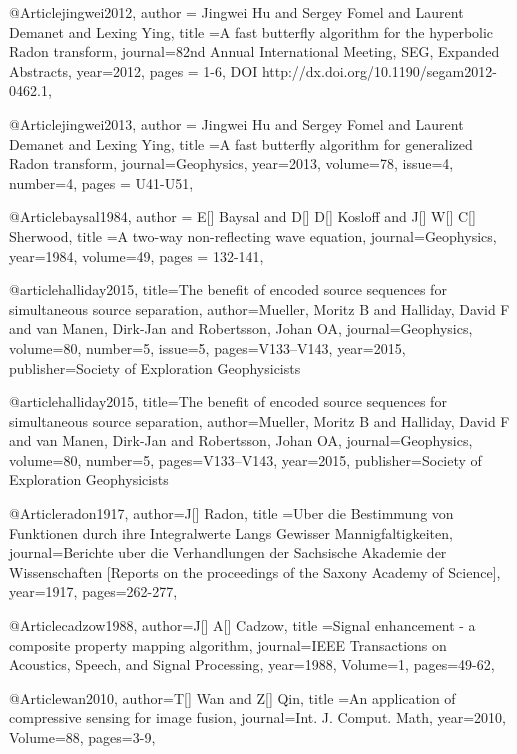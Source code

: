 @Article{jingwei2012,
  author = {Jingwei Hu and Sergey Fomel and Laurent Demanet and Lexing Ying},
  title ={A fast butterfly algorithm for the hyperbolic Radon transform},
  journal={82nd Annual International Meeting, SEG, Expanded Abstracts},
  year=2012,
  pages = {1-6, DOI http://dx.doi.org/10.1190/segam2012-0462.1},
}

@Article{jingwei2013,
  author = {Jingwei Hu and Sergey Fomel and Laurent Demanet and Lexing Ying},
  title ={A fast butterfly algorithm for generalized Radon transform},
  journal={Geophysics},
  year=2013,
  volume=78,
  issue=4,
  number=4,
  pages = {U41-U51},
}

@Article{baysal1984,
  author = {E[] Baysal and D[] D[] Kosloff and J[] W[] C[] Sherwood},
  title ={A two-way non-reflecting wave equation},
  journal={Geophysics},
  year=1984,
  volume={49},
  pages = {132-141},
}



@article{halliday2015,
  title={The benefit of encoded source sequences for simultaneous source separation},
  author={Mueller, Moritz B and Halliday, David F and van Manen, Dirk-Jan and Robertsson, Johan OA},
  journal={Geophysics},
  volume={80},
  number={5},
  issue=5,
  pages={V133--V143},
  year={2015},
  publisher={Society of Exploration Geophysicists}
}

@article{halliday2015,
  title={The benefit of encoded source sequences for simultaneous source separation},
  author={Mueller, Moritz B and Halliday, David F and van Manen, Dirk-Jan and Robertsson, Johan OA},
  journal={Geophysics},
  volume={80},
  number={5},
  pages={V133--V143},
  year={2015},
  publisher={Society of Exploration Geophysicists}
}


@Article{radon1917,
  author={J[] Radon},
  title ={Uber die Bestimmung von Funktionen durch ihre Integralwerte Langs Gewisser Mannigfaltigkeiten},
  journal={Berichte uber die Verhandlungen der Sachsische Akademie der Wissenschaften [Reports on the proceedings of the Saxony Academy of Science]},
  year=1917,
  pages={262-277},
}

@Article{cadzow1988,
  author={J[] A[] Cadzow},
  title ={Signal enhancement - a composite property mapping algorithm},
  journal={IEEE Transactions on Acoustics, Speech, and Signal Processing},
  year=1988,
  Volume=1,
  pages={49-62},
}

@Article{wan2010,
  author={T[] Wan and Z[] Qin},
  title ={An application of compressive sensing for image fusion},
  journal={Int. J. Comput. Math},
  year=2010,
  Volume=88,
  pages={3-9},
}

